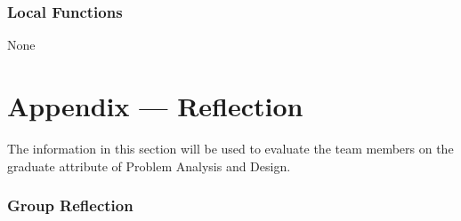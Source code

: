 \documentclass[12pt, titlepage]{article}
\begin{document}
\subsubsection{Local Functions}
None


\newpage

\section{Appendix --- Reflection}


The information in this section will be used to evaluate the team members on the
graduate attribute of Problem Analysis and Design.



\subsubsection*{Group Reflection}
\end{document}
